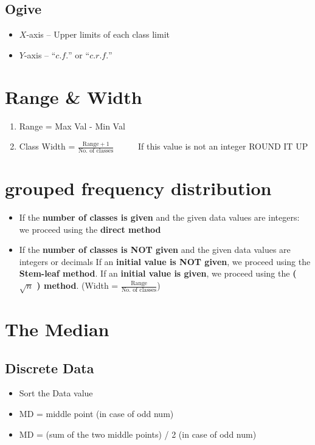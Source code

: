 \documentclass[11pt, a4paper]{article}
\begin{document}
      \subsection{Ogive}
      \begin{itemize}
        \item $X$-axis -- Upper limits of each class limit
        \item $Y$-axis -- “$c.f.$” or “$c.r. f.$”
    \end{itemize}


      \section{Range \& Width}
      \begin{enumerate}
          \item Range = Max Val - Min Val
          \item Class Width = $\frac{\text{Range}+1}{\text{No. of classes}}$  {\ \ \ \ \ \small If this value is not an integer ROUND IT UP}
      \end{enumerate}

     \section{ grouped frequency distribution}
     \begin{itemize}
         \item If the \textbf{number of classes is given} and the given data values are integers: we
         proceed using the \textbf{direct method}
         \item If the \textbf{number of classes is NOT given} and the given data values are integers
or decimals
        \subitem If an \textbf{initial value is NOT given}, we proceed using the \textbf{Stem-leaf method}.
        \subitem If an \textbf{initial value is given}, we proceed using the \textbf{(
            $\sqrt{n}$ ) method}. (Width = $\frac{\text{Range}}{\text{No. of classes}}$)
     \end{itemize}

     \section{The Median}

     \subsection{Discrete Data}
     \begin{itemize}
         \item Sort the Data value   
         \item MD = middle point  {\small (in case of odd num)}
         \item MD = (sum of the two middle points) / 2  {\small (in case of odd num)} 
     \end{itemize}
\end{document}
